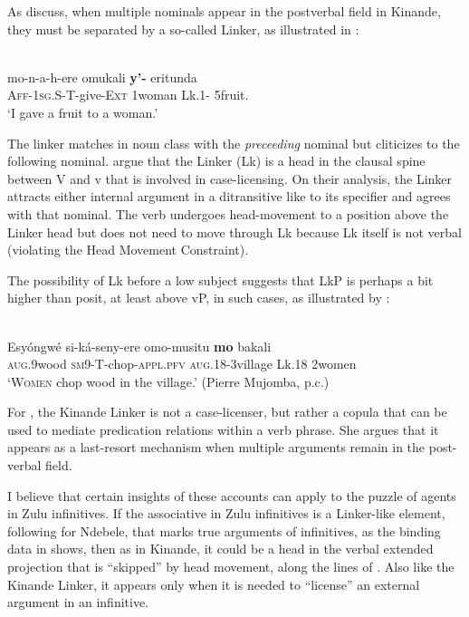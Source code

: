 \documentclass[output=paper,colorlinks,citecolor=brown]{langscibook}
\begin{document}
As \citet{BakerCollins2006} discuss, when multiple nominals appear in the postverbal field in Kinande, they must be separated by a so-called Linker, as illustrated in :

\ea%
    \label{ex:halpert:19}
    \\
    \gll    mo-n-a-h-ere omukali \textbf{y'-} eritunda\\
            \textsc{Aff-1sg.S-T-}give-\textsc{Ext} 1woman Lk.1- 5fruit.\\
    \glt    `I gave a fruit to a woman.' %
\z 

The linker matches in noun class with the \textit{preceeding} nominal but cliticizes to the following nominal. \citet{BakerCollins2006} argue that the Linker (Lk) is a head in the clausal spine between V and v that is involved in case-licensing.  On their analysis, the Linker attracts either internal argument in a ditransitive like  to its specifier and agrees with that nominal.  The verb undergoes head-movement to a position above the Linker head but does not need to move through Lk  because Lk itself is not verbal (violating the Head Movement Constraint).

The possibility of Lk before a low subject suggests that LkP is perhaps a bit higher than \citet{BakerCollins2006} posit, at least above vP, in such cases, as illustrated by :

\ea%
    \label{ex:halpert:20}
    \\
    \gll    Esy\'ongw\'e si-k\'a-seny-ere omo-musitu \textbf{mo} bakali\\
            \textsc{aug}.9wood \textsc{sm}9-T-chop-\textsc{appl.pfv} \textsc{aug}.18-3village Lk.18 2women\\
    \glt    `\textsc{Women} chop wood in the village.' (Pierre Mujomba, p.c.)
\z 

For \citet{Schneider-Zioga2015ACAL, Schneider-Zioga2015WCCFL}, the Kinande Linker is not a case-licenser, but rather a copula that can be used to mediate predication relations within a verb phrase.  She argues that it appears as a last-resort mechanism when multiple arguments remain in the post-verbal field.  

I believe that certain insights of these accounts can apply to the puzzle of agents in Zulu infinitives.  If the associative in Zulu infinitives is a Linker-like element, following \citet{Pietraszko2019} for Ndebele, that marks true arguments of infinitives, as the binding data in  shows, then as in Kinande, it could be a head in the verbal extended projection that is ``skipped'' by head movement, along the lines of \citet{BakerCollins2006}. Also like the Kinande Linker, it appears only when it is needed to ``license'' an external argument in an infinitive.
\end{document}
